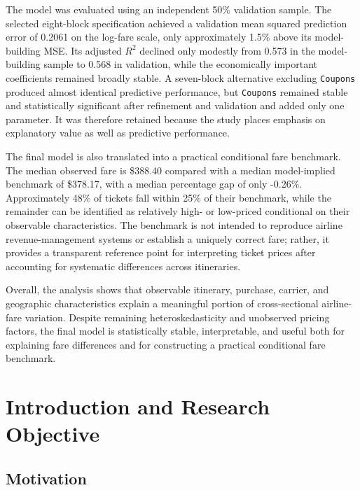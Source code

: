 \documentclass[11pt,a4paper]{article}
\begin{document}
The model was evaluated using an independent 50\% validation sample. The selected eight-block specification achieved a validation mean squared prediction error of 0.2061 on the log-fare scale, only approximately 1.5\% above its model-building MSE. Its adjusted \(R^2\) declined only modestly from 0.573 in the model-building sample to 0.568 in validation, while the economically important coefficients remained broadly stable. A seven-block alternative excluding \texttt{Coupons} produced almost identical predictive performance, but \texttt{Coupons} remained stable and statistically significant after refinement and validation and added only one parameter. It was therefore retained because the study places emphasis on explanatory value as well as predictive performance.

The final model is also translated into a practical conditional fare benchmark. The median observed fare is \$388.40 compared with a median model-implied benchmark of \$378.17, with a median percentage gap of only -0.26\%. Approximately 48\% of tickets fall within 25\% of their benchmark, while the remainder can be identified as relatively high- or low-priced conditional on their observable characteristics. The benchmark is not intended to reproduce airline revenue-management systems or establish a uniquely correct fare; rather, it provides a transparent reference point for interpreting ticket prices after accounting for systematic differences across itineraries.

Overall, the analysis shows that observable itinerary, purchase, carrier, and geographic characteristics explain a meaningful portion of cross-sectional airline-fare variation. Despite remaining heteroskedasticity and unobserved pricing factors, the final model is statistically stable, interpretable, and useful both for explaining fare differences and for constructing a practical conditional fare benchmark.


\clearpage

\section{Introduction and Research Objective}

\subsection{Motivation}
\end{document}
